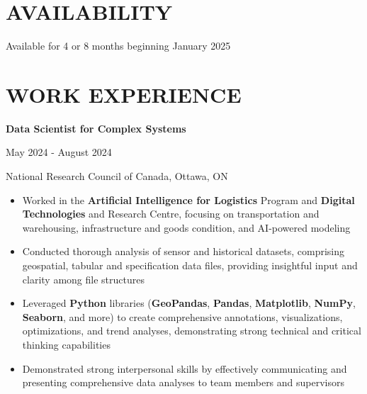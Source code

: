 \documentclass[a4paper,11pt]{article}
\begin{document}
\vspace{2pt}
\section{AVAILABILITY}
	Available for 4 or 8 months beginning January 2025\\

\vspace{2pt}
\section{WORK EXPERIENCE}
\begin{minipage}{.65\linewidth}
    \textbf{Data Scientist for Complex Systems} 
\end{minipage}
\begin{minipage}{.34\linewidth}
    \flushright
    May 2024 - August 2024
\end{minipage}
\begin{minipage}{.65\linewidth}
National Research Council of Canada, Ottawa, ON
\end{minipage}
\begin{minipage}{\linewidth}
\vspace{10pt}
\begin{itemize}

    \item Worked in the \textbf{Artificial Intelligence for Logistics} Program and \textbf{Digital Technologies} and Research Centre, focusing on transportation and warehousing, infrastructure and goods condition, and AI-powered modeling

    \item Conducted thorough analysis of sensor and historical datasets, comprising geospatial, tabular and specification data files, providing insightful input and clarity among file structures
    
    \item Leveraged \textbf{Python} libraries (\textbf{GeoPandas}, \textbf{Pandas}, \textbf{Matplotlib}, \textbf{NumPy}, \textbf{Seaborn}, and more) to create comprehensive annotations, visualizations, optimizations, and trend analyses, demonstrating strong technical and critical thinking capabilities
    
    \item Demonstrated strong interpersonal skills by effectively communicating and presenting comprehensive data analyses to team members and supervisors
    
  \end{itemize}
  \end{minipage}
\end{document}
